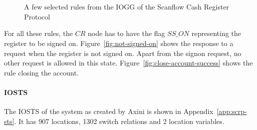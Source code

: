 \begin{figure}[ht]
  \begin{center}
    \hspace{20px}
    \\
    \hspace{20px}
    \\
    \hspace{20px}
  \end{center}
  \caption{A few selected rules from the IOGG of the Scanflow Cash Register Protocol}
  \label{fig:gg-scrp}
\end{figure}

For all these rules, the $CR$ node has to have the flag $\mathit{SS\_ON}$ representing the register to be signed on. Figure~\ref{fig:not-signed-on} shows the response to a request when the register is not signed on. Apart from the signon request, no other request is allowed in this state. Figure~\ref{fig:close-account-success} shows the rule closing the account.

\paragraph*{IOSTS} The IOSTS of the system as created by Axini is shown in Appendix~\ref{app:scrp-sts}. It has 907 locations, 1302 switch relations and 2 location variables.
